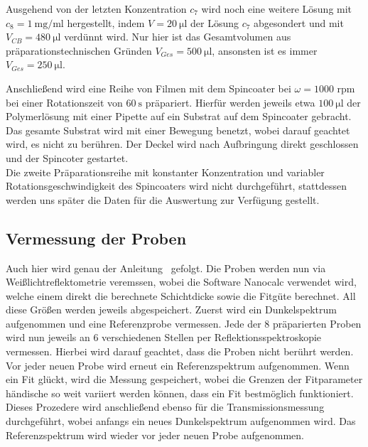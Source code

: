 Ausgehend von der letzten Konzentration $c_7$ wird noch eine weitere Lösung mit $c_8 = \SI{1}{\milli\gram\per\milli\litre}$ hergestellt, indem $V = \SI{20}{\micro\litre}$ der Lösung $c_7$ abgesondert und mit $V_{CB} = \SI{480}{\micro\litre}$ verdünnt wird. Nur hier ist das Gesamtvolumen aus präparationstechnischen Gründen $V_{Ges} = \SI{500}{\micro\litre}$, ansonsten ist es immer $V_{Ges} = \SI{250}{\micro\litre}$.


Anschließend wird eine Reihe von Filmen mit dem Spincoater bei $\omega = 1000$ rpm bei einer Rotationszeit von $\SI{60}{\second}$ präpariert. Hierfür werden jeweils etwa $\SI{100}{\micro\litre}$ der Polymerlösung mit einer Pipette auf ein Substrat auf dem Spincoater gebracht. Das gesamte Substrat wird mit einer Bewegung benetzt, wobei darauf geachtet wird, es nicht zu berühren. Der Deckel wird nach Aufbringung direkt geschlossen und der Spincoter gestartet.\\
Die zweite Präparationsreihe mit konstanter Konzentration und variabler Rotationsgeschwindigkeit des Spincoaters wird nicht durchgeführt, stattdessen werden uns später die Daten für die Auswertung zur Verfügung gestellt. 


\subsection{Vermessung der Proben}
Auch hier wird genau der Anleitung~\cite[]{Anleitung} gefolgt. Die Proben werden nun via Weißlichtreflektometrie veremssen, wobei die Software Nanocalc verwendet wird, welche einem direkt die berechnete Schichtdicke sowie die Fitgüte berechnet. All diese Größen werden jeweils abgespeichert. 
Zuerst wird ein Dunkelspektrum aufgenommen und eine Referenzprobe vermessen.
Jede der 8 präparierten Proben wird nun jeweils an 6 verschiedenen Stellen per Reflektionsspektroskopie vermessen. Hierbei wird darauf geachtet, dass die Proben nicht berührt werden. Vor jeder neuen Probe wird erneut ein Referenzspektrum aufgenommen. Wenn ein Fit glückt, wird die Messung gespeichert, wobei die Grenzen der Fitparameter händische so weit variiert werden können, dass ein Fit bestmöglich funktioniert. 
Dieses Prozedere wird anschließend ebenso für die Transmissionsmessung durchgeführt, wobei anfangs ein neues Dunkelspektrum aufgenommen wird. Das Referenzspektrum wird wieder vor jeder neuen Probe aufgenommen.